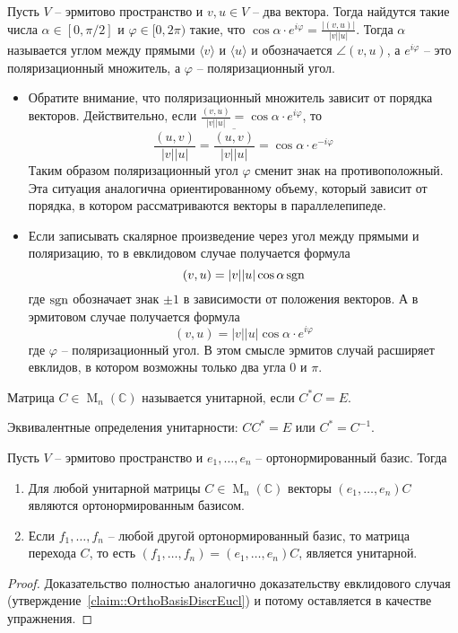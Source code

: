 \begin{definition}
Пусть $V$ -- эрмитово пространство и $v,u\in V$ -- два вектора. Тогда найдутся такие числа $\alpha\in[0,\pi/2]$ и $\varphi\in [0, 2\pi)$ такие, что $\cos \alpha\cdot e^{i\varphi} = \frac{|(v,u)|}{|v| |u|}$. Тогда $\alpha$ называется углом между прямыми $\langle v\rangle$ и $\langle u\rangle$ и обозначается $\angle(v, u)$, а $e^{i\varphi}$ -- это поляризационный множитель, а $\varphi$ -- поляризационный угол.
\end{definition}

\begin{remark}
\begin{itemize}
\item
Обратите внимание, что поляризационный множитель зависит от порядка векторов. Действительно, если $\frac{(v, u)}{|v| |u|} = \cos \alpha \cdot e^{i\varphi}$, то 
\[
\frac{(u, v)}{|v| |u|} = \frac{\overline{(u, v)}}{|v| |u|} = \cos \alpha\cdot e^{-i\varphi}
\]
Таким образом поляризационный угол $\varphi$ сменит знак на противоположный. Эта ситуация аналогична ориентированному объему, который зависит от порядка, в котором рассматриваются векторы в параллелепипеде.

\item
Если записывать скалярное произведение через угол между прямыми и поляризацию, то в евклидовом случае получается формула
\[
(v, u) = |v| |u| \cos \alpha \operatorname{sgn}
\]
где $\operatorname{sgn}$ обозначает знак $\pm 1$ в зависимости от положения векторов. А в эрмитовом случае получается формула
\[
(v, u) = |v| |u| \cos \alpha\cdot  e^{i\varphi}
\]
где $\varphi$ -- поляризационный угол. В этом смысле эрмитов случай расширяет евклидов, в котором возможны только два угла $0$ и $\pi$.
\end{itemize}
\end{remark}

\begin{definition}
Матрица $C\in \operatorname{M}_n(\mathbb C)$ называется унитарной, если $C^* C = E$.
\end{definition}

Эквивалентные определения унитарности: $CC^* = E$ или $C^* = C^{-1}$.

\begin{claim}
Пусть $V$ -- эрмитово пространство и $e_1,\ldots,e_n$ -- ортонормированный базис. Тогда
\begin{enumerate}
\item Для любой унитарной матрицы $C\in \operatorname{M}_n(\mathbb C)$ векторы $(e_1,\ldots,e_n)C$ являются ортонормированным базисом.
\item Если $f_1,\ldots,f_n$ -- любой другой ортонормированный базис, то матрица перехода $C$, то есть $(f_1,\ldots,f_n) = (e_1,\ldots,e_n)C$, является унитарной.
\end{enumerate}
\end{claim}
\begin{proof}
Доказательство полностью аналогично доказательству евклидового случая (утверждение~\ref{claim::OrthoBasisDiscrEucl}) и потому оставляется в качестве упражнения.
\end{proof}


